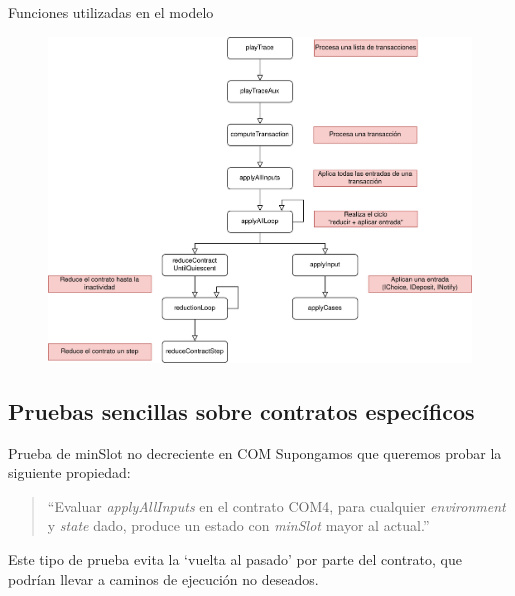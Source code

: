 \documentclass{beamer}
\begin{document}
{\begin{frame}[fragile]{Funciones utilizadas en el modelo}
{\begin{figure}[H]
        \includegraphics[height=0.8\textheight]{Dependencias_Isabelle_Marlowe_6.png}
    \end{figure}
}


\end{frame}
}




\subsection{Pruebas sencillas sobre contratos específicos}

\begin{frame}{Prueba de minSlot no decreciente en COM}
Supongamos que queremos probar la siguiente propiedad:
\vfill
\begin{quote} 
``Evaluar \textit{applyAllInputs} en el contrato COM4, para cualquier \textit{environment} y \textit{state} dado, produce un estado con \textit{minSlot} mayor al actual.''
\end{quote}

\vfill

Este tipo de prueba evita la `vuelta al pasado' por parte del contrato, que podrían llevar a caminos de ejecución no deseados.

\end{frame}
\end{document}
